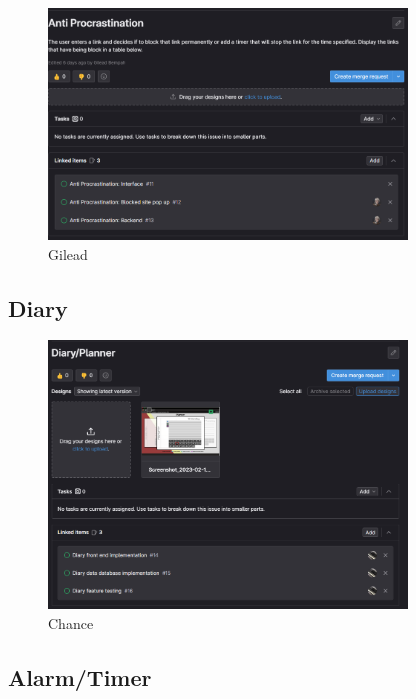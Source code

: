 \documentclass[a4paper]{article}
\begin{document}
\begin{figure}[H] %
	\centering %
	\includegraphics[width=0.85\textwidth]{./images/S2_Anti-Procrastination.png}
	\caption*{Gilead} %
	\label{Fig.S2_Anti-procrastination} %
\end{figure}

\subsection{Diary}

\begin{figure}[H] %
	\centering %
	\includegraphics[width=0.85\textwidth]{./images/S2_Diary.png}
	\caption*{Chance} %
	\label{Fig.S2_Diary} %
\end{figure}

\subsection{Alarm/Timer}
\end{document}
